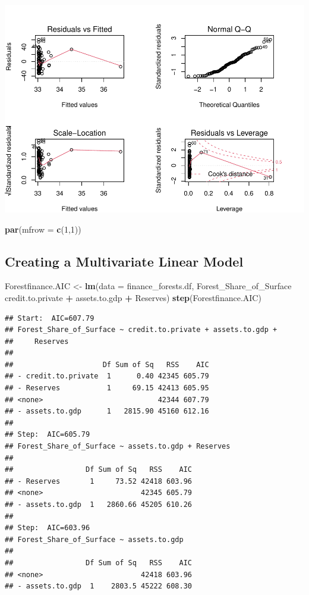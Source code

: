 \documentclass[
  12pt,
]{article}
\newenvironment{Shaded}{\begin{snugshade}}{\end{snugshade}}
\newcommand{\DataTypeTok}[1]{\textcolor[rgb]{0.13,0.29,0.53}{#1}}
\newcommand{\DecValTok}[1]{\textcolor[rgb]{0.00,0.00,0.81}{#1}}
\newcommand{\KeywordTok}[1]{\textcolor[rgb]{0.13,0.29,0.53}{\textbf{#1}}}
\newcommand{\NormalTok}[1]{#1}
\newcommand{\OperatorTok}[1]{\textcolor[rgb]{0.81,0.36,0.00}{\textbf{#1}}}
\newcommand{\StringTok}[1]{\textcolor[rgb]{0.31,0.60,0.02}{#1}}
\begin{document}
\includegraphics{Final_Project_Code_files/figure-latex/unnamed-chunk-6-1.pdf}

\begin{Shaded}
\begin{Highlighting}[]
\KeywordTok{par}\NormalTok{(}\DataTypeTok{mfrow =} \KeywordTok{c}\NormalTok{(}\DecValTok{1}\NormalTok{,}\DecValTok{1}\NormalTok{))}
\end{Highlighting}
\end{Shaded}

\hypertarget{creating-a-multivariate-linear-model}{%
\subsection{Creating a Multivariate Linear
Model}\label{creating-a-multivariate-linear-model}}

\begin{Shaded}
\begin{Highlighting}[]
\NormalTok{Forestfinance.AIC <-}\StringTok{ }\KeywordTok{lm}\NormalTok{(}\DataTypeTok{data =}\NormalTok{ finance_forests.df, Forest_Share_of_Surface }\OperatorTok{~}\StringTok{ }\NormalTok{credit.to.private }\OperatorTok{+}\StringTok{ }\NormalTok{assets.to.gdp }\OperatorTok{+}\StringTok{ }\NormalTok{Reserves)}
 \KeywordTok{step}\NormalTok{(Forestfinance.AIC)}
\end{Highlighting}
\end{Shaded}

\begin{verbatim}
## Start:  AIC=607.79
## Forest_Share_of_Surface ~ credit.to.private + assets.to.gdp + 
##     Reserves
## 
##                     Df Sum of Sq   RSS    AIC
## - credit.to.private  1      0.40 42345 605.79
## - Reserves           1     69.15 42413 605.95
## <none>                           42344 607.79
## - assets.to.gdp      1   2815.90 45160 612.16
## 
## Step:  AIC=605.79
## Forest_Share_of_Surface ~ assets.to.gdp + Reserves
## 
##                 Df Sum of Sq   RSS    AIC
## - Reserves       1     73.52 42418 603.96
## <none>                       42345 605.79
## - assets.to.gdp  1   2860.66 45205 610.26
## 
## Step:  AIC=603.96
## Forest_Share_of_Surface ~ assets.to.gdp
## 
##                 Df Sum of Sq   RSS    AIC
## <none>                       42418 603.96
## - assets.to.gdp  1    2803.5 45222 608.30
\end{verbatim}
\end{document}

